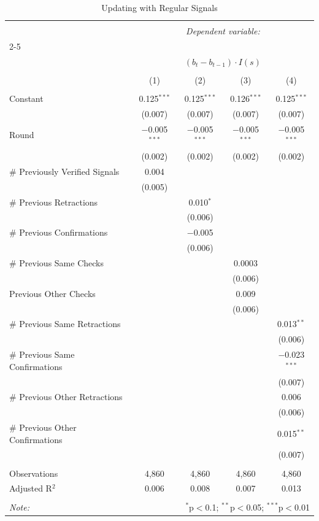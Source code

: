 
\begin{table}[!htbp] \centering 
  \caption{Updating with Regular Signals} 
  \label{} 
\begin{tabular}{@{\extracolsep{5pt}}lcccc} 
\\[-1.8ex]\hline 
\hline \\[-1.8ex] 
 & \multicolumn{4}{c}{\textit{Dependent variable:}} \\ 
\cline{2-5} 
\\[-1.8ex] & \multicolumn{4}{c}{$(b_t - b_{t-1}) \cdot I(s)$} \\ 
\\[-1.8ex] & (1) & (2) & (3) & (4)\\ 
\hline \\[-1.8ex] 
 Constant & 0.125$^{***}$ & 0.125$^{***}$ & 0.126$^{***}$ & 0.125$^{***}$ \\ 
  & (0.007) & (0.007) & (0.007) & (0.007) \\ 
  Round & $-$0.005$^{***}$ & $-$0.005$^{***}$ & $-$0.005$^{***}$ & $-$0.005$^{***}$ \\ 
  & (0.002) & (0.002) & (0.002) & (0.002) \\ 
  # Previously Verified Signals & 0.004 &  &  &  \\ 
  & (0.005) &  &  &  \\ 
  # Previous Retractions &  & 0.010$^{*}$ &  &  \\ 
  &  & (0.006) &  &  \\ 
  # Previous Confirmations &  & $-$0.005 &  &  \\ 
  &  & (0.006) &  &  \\ 
  # Previous Same Checks &  &  & 0.0003 &  \\ 
  &  &  & (0.006) &  \\ 
  Previous Other Checks &  &  & 0.009 &  \\ 
  &  &  & (0.006) &  \\ 
  # Previous Same Retractions &  &  &  & 0.013$^{**}$ \\ 
  &  &  &  & (0.006) \\ 
  # Previous Same Confirmations &  &  &  & $-$0.023$^{***}$ \\ 
  &  &  &  & (0.007) \\ 
  # Previous Other Retractions &  &  &  & 0.006 \\ 
  &  &  &  & (0.006) \\ 
  # Previous Other Confirmations &  &  &  & 0.015$^{**}$ \\ 
  &  &  &  & (0.007) \\ 
 \hline \\[-1.8ex] 
Observations & 4,860 & 4,860 & 4,860 & 4,860 \\ 
Adjusted R$^{2}$ & 0.006 & 0.008 & 0.007 & 0.013 \\ 
\hline 
\hline \\[-1.8ex] 
\textit{Note:}  & \multicolumn{4}{r}{$^{*}$p$<$0.1; $^{**}$p$<$0.05; $^{***}$p$<$0.01} \\ 
\end{tabular} 
\end{table} 
